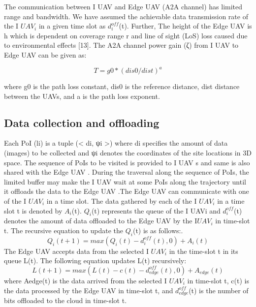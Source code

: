 \documentclass[11pt,twocolumn]{article}
\begin{document}
The communication between I UAV and Edge UAV (A2A channel) has limited range and bandwidth. We have assumed the achievable data transmission rate of the I $UAV_{i}$ in a given time slot as $d_{i}^{off}$(t). Further, The height of the Edge UAV is h which is dependent on coverage range r and line of sight (LoS) loss caused due to environmental effects [13]. The A2A channel power gain (ζ) from I UAV to Edge UAV can be given as: 

\begin{equation}
    T = g0*(dis0/dist)^{a}
\end{equation}

where g0 is the path loss constant, dis0 is the reference distance, dist distance between the UAVs, and a is the path loss exponent.

\subsection{Data collection and offloading}
Each PoI (li) is a tuple (< di, ψi >) where di specifies the amount of data (images) to be collected and ψi denotes the coordinates of the site locations in 3D space. The sequence
of PoIs to be visited is provided to I UAV s and same is also shared with the Edge UAV . During the traversal along the sequence of PoIs, the limited buffer may make the I UAV wait at some PoIs along the trajectory until it offloads the data to the Edge UAV .The Edge UAV can communicate with one of the I $UAV_{i}$ in a time slot. The data gathered by each of the I $UAV_{i}$ in a time slot t is denoted by $A_{i}$(t). $Q_{i}$(t) represents the queue of the I UAVi and $d_{i}^{off}$(t) denotes the amount of data offloaded to the Edge UAV by the I$UAV_{i}$
in time-slot t. The recursive equation to update
the $Q_{i}$(t) is as follows:.
\begin{equation} 
Q_{i}(t + 1) = max(Q_{i}(t) - d_{i}^{off}(t), 0) + A_{i}(t) 
\end{equation}
The Edge UAV accepts data from the selected I $UAV_{i}$ in the time-slot t in its queue L(t). The following equation updates L(t) recursively:
\begin{equation}
    L(t + 1) = max(L(t) - c(t) - d_{edge}^{off}(t), 0) + A_{edge}(t) 
\end{equation}
where Aedge(t) is the data arrived from the selected  I $UAV_{i}$ in time-slot t, c(t) is the data processed by the Edge UAV in time-slot t, and $d_{edge}^{off}$(t) is the number of bits offloaded to the cloud in time-slot t.
\end{document}
